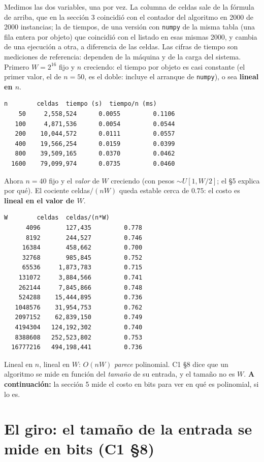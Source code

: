 \documentclass[11pt]{article}
\begin{document}
Medimos las dos variables, una por vez. La columna de celdas sale de la fórmula de arriba, que en la
sección 3 coincidió con el contador del algoritmo en 2000 de 2000 instancias; la de tiempos, de una versión con
\texttt{numpy} de la misma tabla (una fila entera por objeto) que coincidió con el listado en esas mismas 2000, y
cambia de una ejecución a otra, a diferencia de las celdas. Las cifras de tiempo son mediciones de referencia:
dependen de la máquina y de la carga del sistema. Primero $W=2^{16}$ fijo y $n$ creciendo: el tiempo por
objeto es casi constante (el primer valor, el de $n=50$, es el doble: incluye el arranque de \texttt{numpy}), o
sea \textbf{lineal en $n$}.
\begin{lstlisting}[style=salida,basicstyle=\ttfamily\footnotesize\color{black},columns=fixed]
     n        celdas  tiempo (s)  tiempo/n (ms)
    50     2,558,524      0.0055         0.1106
   100     4,871,536      0.0054         0.0544
   200    10,044,572      0.0111         0.0557
   400    19,566,254      0.0159         0.0399
   800    39,509,165      0.0370         0.0462
  1600    79,099,974      0.0735         0.0460
\end{lstlisting}
Ahora $n=40$ fijo y el \emph{valor} de $W$ creciendo (con pesos $\sim U[1,W/2]$; el §5 explica por qué). El
cociente celdas$/(nW)$ queda estable cerca de $0.75$: el costo es \textbf{lineal en el valor de $W$}.
\begin{lstlisting}[style=salida,basicstyle=\ttfamily\footnotesize\color{black},columns=fixed]
         W        celdas  celdas/(n*W)
      4096       127,435         0.778
      8192       244,527         0.746
     16384       458,662         0.700
     32768       985,845         0.752
     65536     1,873,783         0.715
    131072     3,884,566         0.741
    262144     7,845,866         0.748
    524288    15,444,895         0.736
   1048576    31,954,753         0.762
   2097152    62,839,150         0.749
   4194304   124,192,302         0.740
   8388608   252,523,802         0.753
  16777216   494,198,441         0.736
\end{lstlisting}
Lineal en $n$, lineal en $W$: $O(nW)$ \emph{parece} polinomial. C1 §8 dice que un algoritmo se mide en función del \emph{tamaño} de su entrada, y el tamaño no es $W$.
\textbf{A continuación:} la sección 5 mide el costo en bits para ver en qué es polinomial, si lo es.

\section{El giro: el tamaño de la entrada se mide en bits (C1 §8)}
\end{document}
